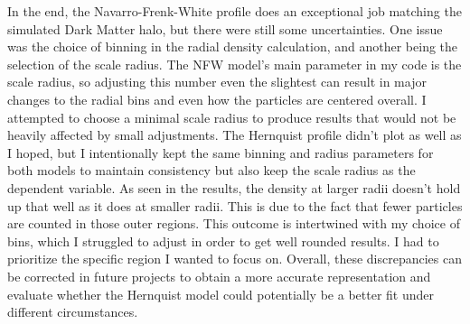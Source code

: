 \documentclass[fleqn,usenatbib]{mnras}
\begin{document}
In the end, the Navarro-Frenk-White profile does an exceptional job matching the simulated Dark Matter halo, but there were still some uncertainties. One issue was the choice of binning in the radial density calculation, and another being the selection of the scale radius. The NFW model's main parameter in my code is the scale radius, so adjusting this number even the slightest can result in major changes to the radial bins and even how the particles are centered overall. I attempted to choose a minimal scale radius to produce results that would not be heavily affected by small adjustments. The Hernquist profile didn't plot as well as I hoped, but I intentionally kept the same binning and radius parameters for both models to maintain consistency but also keep the scale radius as the dependent variable. As seen in the results, the density at larger radii doesn't hold up that well as it does at smaller radii. This is due to the fact that fewer particles are counted in those outer regions. This outcome is intertwined with my choice of bins, which I struggled to adjust in order to get well rounded results. I had to prioritize the specific region I wanted to focus on. Overall, these discrepancies can be corrected in future projects to obtain a more accurate representation and evaluate whether the Hernquist model could potentially be a better fit under different circumstances. 
\end{document}
